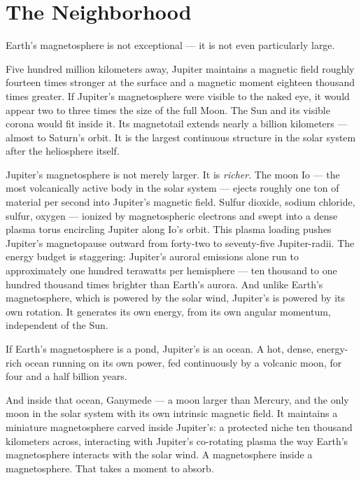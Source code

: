 
\section*{The Neighborhood}
\label{spine:ws-the-neighborhood}

Earth's magnetosphere is not exceptional --- it is not even particularly large.

Five hundred million kilometers away, Jupiter maintains a magnetic field roughly fourteen times stronger at the surface and a magnetic moment eighteen thousand times greater. If Jupiter's magnetosphere were visible to the naked eye, it would appear two to three times the size of the full Moon. The Sun and its visible corona would fit inside it. Its magnetotail extends nearly a billion kilometers --- almost to Saturn's orbit. It is the largest continuous structure in the solar system after the heliosphere itself.


Jupiter's magnetosphere is not merely larger. It is \textit{richer}. The moon Io --- the most volcanically active body in the solar system --- ejects roughly one ton of material per second into Jupiter's magnetic field. Sulfur dioxide, sodium chloride, sulfur, oxygen --- ionized by magnetospheric electrons and swept into a dense plasma torus encircling Jupiter along Io's orbit. This plasma loading pushes Jupiter's magnetopause outward from forty-two to seventy-five Jupiter-radii. The energy budget is staggering: Jupiter's auroral emissions alone run to approximately one hundred terawatts per hemisphere --- ten thousand to one hundred thousand times brighter than Earth's aurora. And unlike Earth's magnetosphere, which is powered by the solar wind, Jupiter's is powered by its own rotation. It generates its own energy, from its own angular momentum, independent of the Sun.

If Earth's magnetosphere is a pond, Jupiter's is an ocean. A hot, dense, energy-rich ocean running on its own power, fed continuously by a volcanic moon, for four and a half billion years.

And inside that ocean, Ganymede --- a moon larger than Mercury, and the only moon in the solar system with its own intrinsic magnetic field. It maintains a miniature magnetosphere carved inside Jupiter's: a protected niche ten thousand kilometers across, interacting with Jupiter's co-rotating plasma the way Earth's magnetosphere interacts with the solar wind. A magnetosphere inside a magnetosphere. That takes a moment to absorb.

